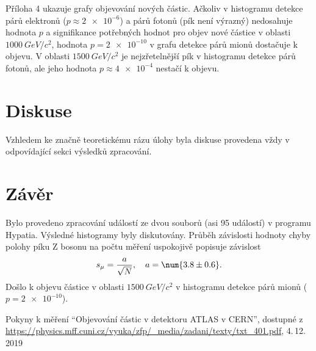 \documentclass{scirep}
\begin{document}
    Příloha 4 ukazuje grafy objevování nových částic.
    Ačkoliv v histogramu detekce párů elektronů ($p \approx \num{2e-6}$) a párů fotonů (pík není výrazný) nedosahuje hodnota $p$ a signifikance potřebných hodnot pro objev nové částice v oblasti $\SI{1000}{GeV/c^2}$, hodnota $p = \num{2e-10}$ v grafu detekce párů mionů dostačuje k objevu.
    V oblasti $\SI{1500}{GeV/c^2}$ je nejzřetelnější pík v histogramu detekce párů fotonů, ale jeho hodnota $p \approx \num{4e-4}$ nestačí k objevu.


    \section*{Diskuse}
    Vzhledem ke značně teoretickému rázu úlohy byla diskuse provedena vždy v odpovídající sekci výsledků zpracování.

    \section*{Závěr}
    Bylo provedeno zpracování událostí ze dvou souborů (asi 95 událostí) v programu Hypatia.
    Výsledné histogramy byly diskutovány.
    Průběh závislosti hodnoty chyby polohy píku Z bosonu na počtu měření uspokojivě popisuje závislost
    \[ s_{\mu} = \frac{a}{\sqrt{N}},~~~ a = \num{3.8 \pm 0.6}. \]
    Došlo k objevu částice v oblasti $\SI{1500}{GeV/c^2}$ v histogramu detekce párů mionů ($p = \num{2e-10}$).

    \begin{thebibliography}{}

        Pokyny k měření ``Objevování částic v detektoru ATLAS v CERN'', dostupné z\\ \url{https://physics.mff.cuni.cz/vyuka/zfp/_media/zadani/texty/txt_401.pdf}, 4.\,12.\,2019

    \end{thebibliography}
\end{document}
